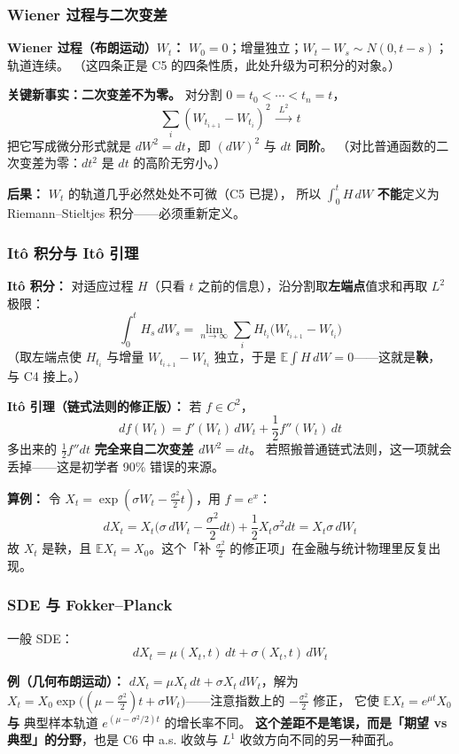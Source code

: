 \subsubsection{Wiener 过程与二次变差}

\textbf{Wiener 过程（布朗运动）$W_t$：} $W_0=0$；增量独立；$W_t-W_s\sim N(0,t-s)$；轨道连续。
（这四条正是 C5 的四条性质，此处升级为可积分的对象。）

\textbf{关键新事实：二次变差不为零。} 对分割 $0=t_0<\cdots<t_n=t$，
\[
\sum_i(W_{t_{i+1}}-W_{t_i})^2\ \xrightarrow{\ L^2\ }\ t
\]
把它写成微分形式就是 $dW^2=dt$，即 $(dW)^2$ 与 $dt$ \textbf{同阶}。
（对比普通函数的二次变差为零：$dt^2$ 是 $dt$ 的高阶无穷小。）

\textbf{后果：} $W_t$ 的轨道几乎必然处处不可微（C5 已提），
所以 $\int_0^t H\,dW$ \textbf{不能}定义为 Riemann--Stieltjes 积分——必须重新定义。

\subsubsection{Itô 积分与 Itô 引理}

\textbf{Itô 积分：} 对适应过程 $H$（只看 $t$ 之前的信息），沿分割取\textbf{左端点}值求和再取 $L^2$ 极限：
\[
\int_0^t H_s\,dW_s=\lim_{n\to\infty}\sum_i H_{t_i}\big(W_{t_{i+1}}-W_{t_i}\big)
\]
（取左端点使 $H_{t_i}$ 与增量 $W_{t_{i+1}}-W_{t_i}$ 独立，于是 $\mathbb E\int H\,dW=0$——这就是\textbf{鞅}，
与 C4 接上。）

\textbf{Itô 引理（链式法则的修正版）：} 若 $f\in C^{2}$，
\[
df(W_t)=f'(W_t)\,dW_t+\frac12f''(W_t)\,dt
\]
多出来的 $\frac12f''dt$ \textbf{完全来自二次变差 $dW^2=dt$}。
若照搬普通链式法则，这一项就会丢掉——这是初学者 90\% 错误的来源。

\textbf{算例：} 令 $X_t=\exp(\sigma W_t-\frac{\sigma^2}{2}t)$，用 $f=e^x$：
\[
dX_t=X_t\Big(\sigma\,dW_t-\frac{\sigma^2}{2}dt\Big)+\frac12X_t\sigma^2dt=X_t\sigma\,dW_t
\]
故 $X_t$ 是鞅，且 $\mathbb E X_t=X_0$。这个「补 $\frac{\sigma^2}{2}$ 的修正项」在金融与统计物理里反复出现。

\subsubsection{SDE 与 Fokker--Planck}

一般 SDE：
\[
dX_t=\mu(X_t,t)\,dt+\sigma(X_t,t)\,dW_t
\]

\textbf{例（几何布朗运动）：} $dX_t=\mu X_t\,dt+\sigma X_t\,dW_t$，解为
$X_t=X_0\exp\big((\mu-\frac{\sigma^2}{2})t+\sigma W_t\big)$——注意指数上的 $-\frac{\sigma^2}{2}$ 修正，
它使 $\mathbb E X_t=e^{\mu t}X_0$ \textbf{与} 典型样本轨道 $e^{(\mu-\sigma^2/2)t}$ 的增长率不同。
\textbf{这个差距不是笔误，而是「期望 vs 典型」的分野}，也是 C6 中 a.s. 收敛与 $L^1$ 收敛方向不同的另一种面孔。

